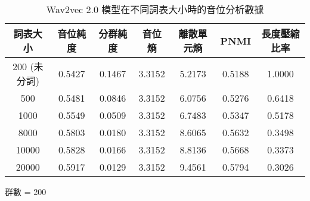 \begin{table}[!htbp]
    \jefftablesep        

    \begin{subtable}[t]{\textwidth}
        \centering
        \begin{tabular}{|c|c|c|c|c|c|c|} \hline 
                詞表大小  & 音位純度 & 分群純度 & 音位熵 & 離散單元熵 &    PNMI & 長度壓縮比率 \\ \hline 
 200 (未分詞)&  0.5427 &   0.1467 & 3.3152 &     5.2173 & 0.5188 &1.0000\\ \hline 
                  500  &   0.5481&     0.0846    &3.3152 &   6.0756  &       0.5276 &0.6418 \\ \hline %
                 1000  &   0.5549&     0.0509    &3.3152 &   6.7483  &       0.5347 &0.5178 \\ \hline %
                 8000  &   0.5803&     0.0180    &3.3152 &   8.6065  &       0.5632 &0.3498 \\ \hline %
                10000  &   0.5828&     0.0166    &3.3152 &   8.8136  &       0.5668 &0.3373 \\ \hline %
                20000  &   0.5917&     0.0129    &3.3152 &   9.4561  &       0.5794 &0.3026  \\ \hline %
        \end{tabular}
\caption{群數 = 200}
        \label{tab:ch4-w2v2-phn-clu200}
    \end{subtable}        

\caption{Wav2vec 2.0 模型在不同詞表大小時的音位分析數據}
    \label{tab:w2v2-phn-results}
\end{table}

